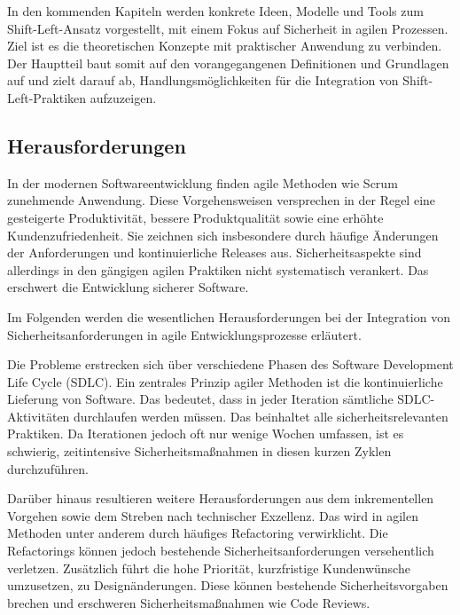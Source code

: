 \documentclass[acmtog]{acmart}
\begin{document}
In den kommenden Kapiteln werden konkrete Ideen, Modelle und Tools zum Shift-Left-Ansatz vorgestellt, mit einem Fokus auf Sicherheit in agilen Prozessen. Ziel ist es die theoretischen Konzepte mit praktischer Anwendung zu verbinden. Der Hauptteil baut somit auf den vorangegangenen Definitionen und Grundlagen auf und zielt darauf ab, Handlungsmöglichkeiten für die Integration von Shift-Left-Praktiken aufzuzeigen.





\subsection{Herausforderungen}
In der modernen Softwareentwicklung finden agile Methoden wie Scrum zunehmende Anwendung.
Diese Vorgehensweisen versprechen in der Regel eine gesteigerte Produktivität, bessere Produktqualität sowie eine erhöhte Kundenzufriedenheit. 
Sie zeichnen sich insbesondere durch häufige Änderungen der Anforderungen und kontinuierliche Releases aus.
Sicherheitsaspekte sind allerdings in den gängigen agilen Praktiken nicht systematisch verankert. Das erschwert die Entwicklung sicherer Software. \cite{oueslati_literature_2015}

Im Folgenden werden die wesentlichen Herausforderungen bei der Integration von Sicherheitsanforderungen in agile Entwicklungsprozesse erläutert. 

Die Probleme erstrecken sich über verschiedene Phasen des Software Development Life Cycle (SDLC).
Ein zentrales Prinzip agiler Methoden ist die kontinuierliche Lieferung von Software. 
Das bedeutet, dass in jeder Iteration sämtliche SDLC-Aktivitäten durchlaufen werden müssen.
Das beinhaltet alle sicherheitsrelevanten Praktiken. 
Da Iterationen jedoch oft nur wenige Wochen umfassen, ist es schwierig, zeitintensive Sicherheitsmaßnahmen in diesen kurzen Zyklen durchzuführen. \cite{oueslati_literature_2015}

Darüber hinaus resultieren weitere Herausforderungen aus dem inkrementellen Vorgehen sowie dem Streben nach technischer Exzellenz. 
Das wird in agilen Methoden unter anderem durch häufiges Refactoring verwirklicht. 
Die Refactorings können jedoch bestehende Sicherheitsanforderungen versehentlich verletzen. 
Zusätzlich führt die hohe Priorität, kurzfristige Kundenwünsche umzusetzen, zu Designänderungen.
Diese können bestehende Sicherheitsvorgaben brechen und erschweren Sicherheitsmaßnahmen wie Code Reviews. \cite{oueslati_literature_2015}
\end{document}
